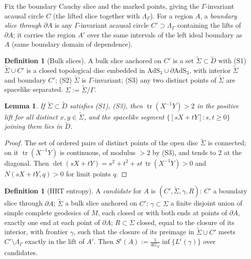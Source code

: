 \documentclass[aps,prd,onecolumn,superscriptaddress,nofootinbib,amsmath,amssymb,11pt]{revtex4-2}
\newtheorem{lemma}[theorem]{Lemma}
\theoremstyle{definition}
\newtheorem{definition}[theorem]{Definition}
\newcommand{\AdS}{\mathrm{AdS}_3}
\newcommand{\eps}{\epsilon}
\newcommand{\Dt}{\tilde D}
\newcommand{\tr}{\operatorname{tr}}
\begin{document}
Fix the boundary Cauchy slice and the marked points, giving the $\Gamma$-invariant acausal circle $C$ (the lifted slice
together with $\Lambda_\Gamma$). For a region $A$, a \emph{boundary slice through $\partial A$} is any $\Gamma$-invariant
acausal circle $C'\supset\Lambda_\Gamma$ containing the lifts of $\partial A$; it carries the region $A'$ over the same
intervals of the left ideal boundary as $A$ (same boundary domain of dependence).

\begin{definition}[Bulk slices]\label{def:slice}
A bulk slice anchored on $C'$ is a set $\tilde\Sigma\subset\Dt$ with
(S1) $\tilde\Sigma\cup C'$ is a closed topological disc embedded in $\AdS\cup\partial\AdS$, with interior $\tilde\Sigma$ and
boundary $C'$; (S2) $\tilde\Sigma$ is $\Gamma$-invariant; (S3) any two distinct points of $\tilde\Sigma$ are spacelike
separated. $\Sigma:=\tilde\Sigma/\Gamma$.
\end{definition}

\begin{lemma}\label{lem:63a}
If $\tilde\Sigma\subset\Dt$ satisfies (S1), (S3), then $\tr(X^{-1}Y)>2$ in the positive lift for all distinct
$x,y\in\tilde\Sigma$, and the spacelike segment $\{[sX+tY]:s,t\ge0\}$ joining them lies in $\Dt$.
\end{lemma}

\begin{proof}
The set of ordered pairs of distinct points of the open disc $\tilde\Sigma$ is connected; on it $\tr(X^{-1}Y)$ is continuous,
of modulus $>2$ by (S3), and tends to $2$ at the diagonal. Then $\det(sX+tY)=s^2+t^2+st\,\tr(X^{-1}Y)>0$ and
$N(sX+tY,q)>0$ for limit points $q$.
\end{proof}

\begin{definition}[HRT entropy]\label{def:HRT}
A \emph{candidate} for $A$ is $(C',\tilde\Sigma,\gamma,R)$: $C'$ a boundary slice through $\partial A$; $\tilde\Sigma$ a bulk
slice anchored on $C'$; $\gamma\subset\Sigma$ a finite disjoint union of simple complete geodesics of $M$, each closed or
with both ends at points of $\partial A$, exactly one end at each point of $\partial A$; $R\subset\Sigma$ closed, equal to
the closure of its interior, with frontier $\gamma$, such that the closure of its preimage in $\tilde\Sigma\cup C'$ meets
$C'\setminus\Lambda_\Gamma$ exactly in the lift of $A'$. Then
$S^\eps(A):=\frac{1}{4G_N}\inf\{L^\eps(\gamma)\}$ over candidates.
\end{definition}
\end{document}

